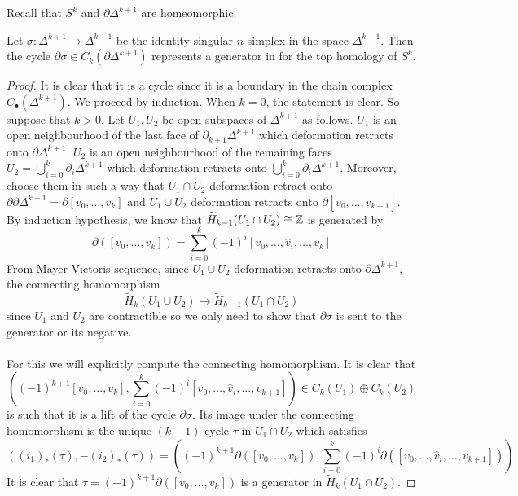 \documentclass[a4paper]{article}
\begin{document}
Recall that $S^k$ and $\partial\Delta^{k+1}$ are homeomorphic. 

\begin{prp}{}{} Let $\sigma:\Delta^{k+1}\to\Delta^{k+1}$ be the identity singular $n$-simplex in the space $\Delta^{k+1}$. Then the cycle $\partial\sigma\in C_k(\partial\Delta^{k+1})$ represents a generator in for the top homology of $S^k$. \tcbline
\begin{proof}
It is clear that it is a cycle since it is a boundary in the chain complex $C_\bullet(\Delta^{k+1})$. We proceed by induction. When $k=0$, the statement is clear. So suppose that $k>0$. Let $U_1,U_2$ be open subspaces of $\Delta^{k+1}$ as follows. $U_1$ is an open neighbourhood of the last face of $\partial_{k+1}\Delta^{k+1}$ which deformation retracts onto $\partial\Delta^{k+1}$. $U_2$ is an open neighbourhood of the remaining faces $U_2=\bigcup_{i=0}^k\partial_i\Delta^{k+1}$ which deformation retracts onto $\bigcup_{i=0}^k\partial_i\Delta^{k+1}$. Moreover, choose them in such a way that $U_1\cap U_2$ deformation retract onto $\partial\partial\Delta^{k+1}=\partial[v_0,\dots,v_k]$ and $U_1\cup U_2$ deformation retracts onto $\partial[v_0,\dots,v_{k+1}]$. By induction hypothesis, we know that $\widetilde{H}_{k-1}(U_1\cap U_2)\cong\mathbb{Z}$ is generated by $$\partial([v_0,\dots,v_k])=\sum_{i=0}^k(-1)^i[v_0,\dots,\hat{v}_i,\dots,v_k]$$ From Mayer-Vietoris sequence, since $U_1\cup U_2$ deformation retracts onto $\partial\Delta^{k+1}$, the connecting homomorphism $$\widetilde{H}_k(U_1\cup U_2)\to\widetilde{H}_{k-1}(U_1\cap U_2)$$ since $U_1$ and $U_2$ are contractible so we only need to show that $\partial\sigma$ is sent to the generator or its negative. \\~\\

For this we will explicitly compute the connecting homomorphism. It is clear that $$\left((-1)^{k+1}[v_0,\dots,v_k],\sum_{i=0}^k(-1)^i[v_0,\dots,\hat{v}_i,\dots,v_{k+1}]\right)\in C_k(U_1)\oplus C_k(U_2)$$ is such that it is a lift of the cycle $\partial\sigma$. Its image under the connecting homomorphism is the unique $(k-1)$-cycle $\tau$ in $U_1\cap U_2$ which satisfies $$\left((i_1)_\ast(\tau),-(i_2)_\ast(\tau)\right)=\left((-1)^{k+1}\partial([v_0,\dots,v_k]),\sum_{i=0}^k(-1)^i\partial([v_0,\dots,\hat{v}_i,\dots,v_{k+1}])\right)$$ It is clear that $\tau=(-1)^{k+1}\partial([v_0,\dots,v_k])$ is a generator in $\widetilde{H}_k(U_1\cap U_2)$. 
\end{proof}
\end{prp}
\end{document}
